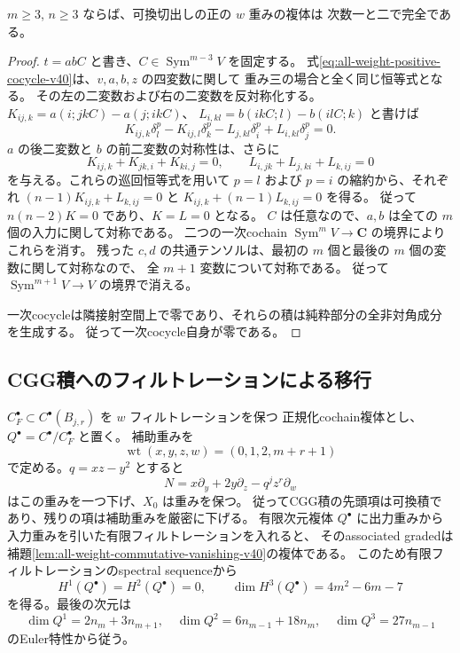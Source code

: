 \begin{lemma}[任意の間隔での正の重みの消滅]
\label{lem:all-weight-commutative-vanishing-v40}
$m\ge3$, $n\ge3$ ならば、可換切出しの正の $w$ 重みの複体は
次数一と二で完全である。
\end{lemma}

\begin{proof}
$t=abC$ と書き、$C\in\operatorname{Sym}^{m-3}V$ を固定する。
式\eqref{eq:all-weight-positive-cocycle-v40}は、$v,a,b,z$ の四変数に関して
重み三の場合と全く同じ恒等式となる。
その左の二変数および右の二変数を反対称化する。
$K_{ij,k}=a(i;jkC)-a(j;ikC)$、
$L_{i,kl}=b(ikC;l)-b(ilC;k)$ と書けば
\[
 K_{ij,k}\delta_l^p-K_{ij,l}\delta_k^p
 -L_{j,kl}\delta_i^p+L_{i,kl}\delta_j^p=0.
\]
$a$ の後二変数と $b$ の前二変数の対称性は、さらに
\[
 K_{ij,k}+K_{jk,i}+K_{ki,j}=0,\qquad
 L_{i,jk}+L_{j,ki}+L_{k,ij}=0
\]
を与える。これらの巡回恒等式を用いて
$p=l$ および $p=i$ の縮約から、それぞれ
$(n-1)K_{ij,k}+L_{k,ij}=0$ と
$K_{ij,k}+(n-1)L_{k,ij}=0$ を得る。
従って $n(n-2)K=0$ であり、$K=L=0$ となる。
$C$ は任意なので、$a,b$ は全ての $m$ 個の入力に関して対称である。
二つの一次cochain $\operatorname{Sym}^mV\to\mathbf C$ の境界によりこれらを消す。
残った $c,d$ の共通テンソルは、最初の $m$ 個と最後の $m$ 個の変数に関して対称なので、
全 $m+1$ 変数について対称である。
従って $\operatorname{Sym}^{m+1}V\to V$ の境界で消える。

一次cocycleは隣接射空間上で零であり、それらの積は純粋部分の全非対角成分を生成する。
従って一次cocycle自身が零である。
\end{proof}

\subsection{CGG積へのフィルトレーションによる移行}

$C_F^\bullet\subset C^\bullet(B_{j,r})$ を $w$ フィルトレーションを保つ
正規化cochain複体とし、$Q^\bullet=C^\bullet/C_F^\bullet$ と置く。
補助重みを
\[
 \operatorname{wt}(x,y,z,w)=(0,1,2,m+r+1)
\]
で定める。$q=xz-y^2$ とすると
\[
 N=x\partial_y+2y\partial_z-q^jz^r\partial_w
\]
はこの重みを一つ下げ、$X_0$ は重みを保つ。
従ってCGG積の先頭項は可換積であり、残りの項は補助重みを厳密に下げる。
有限次元複体 $Q^\bullet$ に出力重みから入力重みを引いた有限フィルトレーションを入れると、
そのassociated gradedは補題\ref{lem:all-weight-commutative-vanishing-v40}の複体である。
このため有限フィルトレーションのspectral sequenceから
\begin{equation}
 H^1(Q^\bullet)=H^2(Q^\bullet)=0,
 \qquad \dim H^3(Q^\bullet)=4m^2-6m-7
 \label{eq:all-weight-positive-cohomology-v40}
\end{equation}
を得る。最後の次元は
\[
 \dim Q^1=2n_m+3n_{m+1},\quad
 \dim Q^2=6n_{m-1}+18n_m,\quad
 \dim Q^3=27n_{m-1}
\]
のEuler特性から従う。


